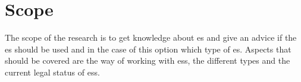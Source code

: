 \section{Scope}

The scope of the research is to get knowledge about \gls{es} and give an advice if the \gls{es} should be used and in the case of this option which type of \gls{es}. Aspects that should be covered are the way of working with \glspl{es}, the different types and the current legal status of \glspl{es}.
